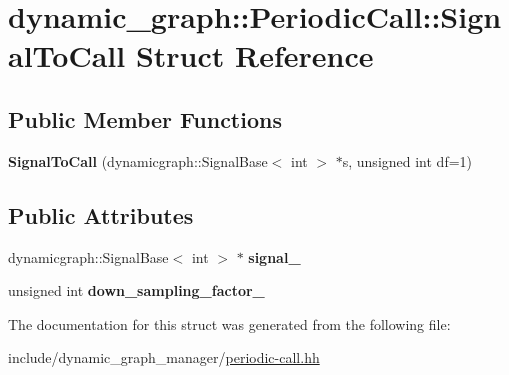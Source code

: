 \hypertarget{structdynamic__graph_1_1PeriodicCall_1_1SignalToCall}{}\section{dynamic\+\_\+graph\+:\+:Periodic\+Call\+:\+:Signal\+To\+Call Struct Reference}
\label{structdynamic__graph_1_1PeriodicCall_1_1SignalToCall}
\subsection*{Public Member Functions}
\begin{DoxyCompactItemize}
\item 
{\bfseries Signal\+To\+Call} (dynamicgraph\+::\+Signal\+Base$<$ int $>$ $\ast$s, unsigned int df=1)\hypertarget{structdynamic__graph_1_1PeriodicCall_1_1SignalToCall_a9efbb8370bdb3ebadb9ee9e8f4a6c209}{}\label{structdynamic__graph_1_1PeriodicCall_1_1SignalToCall_a9efbb8370bdb3ebadb9ee9e8f4a6c209}

\end{DoxyCompactItemize}
\subsection*{Public Attributes}
\begin{DoxyCompactItemize}
\item 
dynamicgraph\+::\+Signal\+Base$<$ int $>$ $\ast$ {\bfseries signal\+\_\+}\hypertarget{structdynamic__graph_1_1PeriodicCall_1_1SignalToCall_aa4ca46512452a1107926da8a92803597}{}\label{structdynamic__graph_1_1PeriodicCall_1_1SignalToCall_aa4ca46512452a1107926da8a92803597}

\item 
unsigned int {\bfseries down\+\_\+sampling\+\_\+factor\+\_\+}\hypertarget{structdynamic__graph_1_1PeriodicCall_1_1SignalToCall_aae29661d7a6753e2bd60565ce2a7d146}{}\label{structdynamic__graph_1_1PeriodicCall_1_1SignalToCall_aae29661d7a6753e2bd60565ce2a7d146}

\end{DoxyCompactItemize}


The documentation for this struct was generated from the following file\+:\begin{DoxyCompactItemize}
\item 
include/dynamic\+\_\+graph\+\_\+manager/\hyperlink{periodic-call_8hh}{periodic-\/call.\+hh}\end{DoxyCompactItemize}
